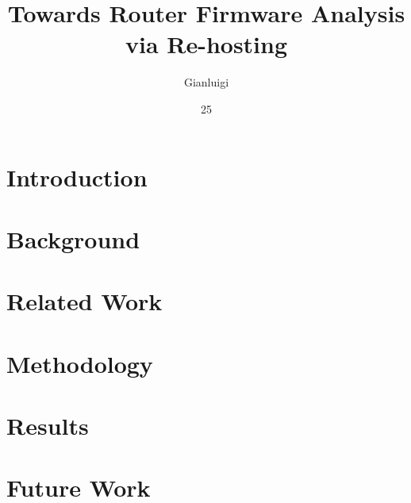 \documentclass[tg, eng, dv]{ita}    %
\author{Gianluigi}{Dal Toso}
\title{Towards Router Firmware Analysis via Re-hosting}
\date{25}{JUNE}{2021}
\begin{document}


\mainmatter

\chapter{Introduction}


\chapter{Background}


\chapter{Related Work}


\chapter{Methodology}


\chapter{Results}


\chapter{Future Work}


% 

% 

% 


\renewcommand\bibname{\itareferencesnamebabel} %

\end{document}

